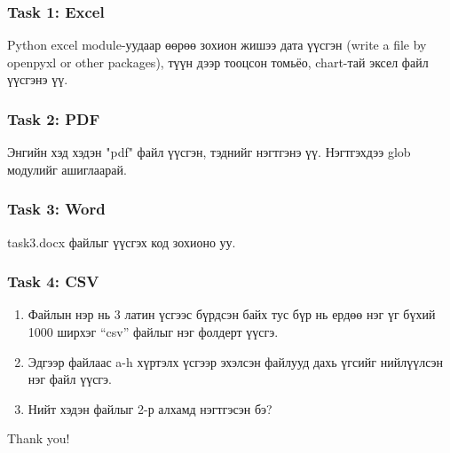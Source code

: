 \documentclass{beamer}
\begin{document}
\begin{frame}
    \frametitle{Task 1: Excel}
    Python excel module-уудаар өөрөө зохион жишээ дата үүсгэн 
    (write a file by openpyxl or other packages), түүн дээр тооцсон томьёо, chart-тай эксел файл үүсгэнэ үү.
\end{frame}

\begin{frame}
    \frametitle{Task 2: PDF}
    Энгийн хэд хэдэн "pdf" файл үүсгэн, тэднийг нэгтгэнэ үү. Нэгтгэхдээ glob модулийг ашиглаарай.
\end{frame}

\begin{frame}
    \frametitle{Task 3: Word}
    task3.docx файлыг үүсгэх код зохионо уу. 
\end{frame}

\begin{frame}
    \frametitle{Task 4: CSV}
    \begin{enumerate}
        \item Файлын нэр нь 3 латин үсгээс бүрдсэн байх тус бүр нь ердөө нэг үг бүхий 1000 ширхэг “csv” файлыг нэг фолдерт үүсгэ. 
        \item Эдгээр файлаас a-h хүртэлх үсгээр эхэлсэн файлууд дахь үгсийг нийлүүлсэн нэг файл үүсгэ. 
        \item Нийт хэдэн файлыг 2-р алхамд нэгтгэсэн бэ?
    \end{enumerate}
    
\end{frame}

\begin{frame}
\Huge{\centerline{Thank you!}}
\end{frame}

\end{document}
